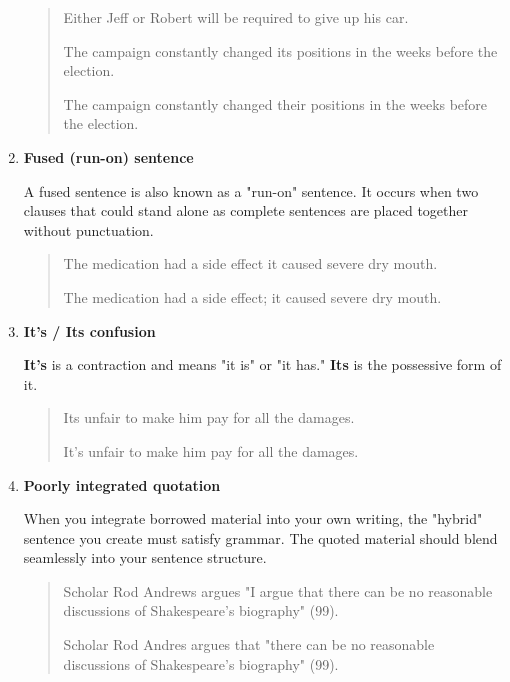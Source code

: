 \begin{enumerate}
\begin{quote}
Either Jeff or Robert will be required to give up his car. 
\medskip

The campaign constantly changed its positions in the weeks before the election. 

The campaign constantly changed their positions in the weeks before the election. 
\end{quote}

\item \textbf{Fused (run-on) sentence}

A fused sentence is also known as a "run-on" sentence. It occurs when two
clauses that could stand alone as complete sentences are placed together
without punctuation.

 \begin{quote}
The medication had a side effect it caused severe dry mouth. 

The medication had a side effect; it caused severe dry mouth. 
\end{quote}

\item \textbf{It's / Its confusion}

\textbf{It's} is a contraction and means "it is" or "it has." \textbf{Its} is the
possessive form of it.

\begin{quote}
Its unfair to make him pay for all the damages. 

It's unfair to make him pay for all the damages. 

\end{quote}

\item \textbf{Poorly integrated quotation}

When you integrate borrowed material into your own writing, the 
"hybrid" sentence you create must satisfy grammar. The quoted material should
blend seamlessly into your sentence structure.

\begin{quote}
Scholar Rod Andrews argues "I argue that there can be no 
reasonable discussions of Shakespeare's biography" (99). 

Scholar Rod Andres argues that "there can be no reasonable discussions 
of Shakespeare's biography" (99). 
\end{quote}


\end{enumerate}

